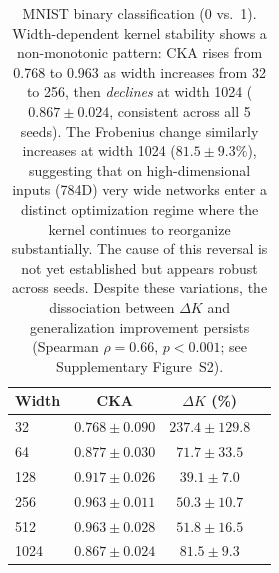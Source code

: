 \documentclass[twoside,11pt]{article}
\begin{document}
\begin{table}[ht]
    \centering
    \caption{MNIST binary classification (0 vs.\ 1).  Width-dependent kernel stability shows a non-monotonic pattern: CKA rises from 0.768 to 0.963 as width increases from 32 to 256, then \emph{declines} at width 1024 ($0.867\pm0.024$, consistent across all 5 seeds).  The Frobenius change similarly increases at width 1024 ($81.5\pm9.3\%$), suggesting that on high-dimensional inputs (784D) very wide networks enter a distinct optimization regime where the kernel continues to reorganize substantially.  The cause of this reversal is not yet established but appears robust across seeds.  Despite these variations, the dissociation between $\Delta K$ and generalization improvement persists (Spearman $\rho=0.66$, $p<0.001$; see Supplementary Figure~S2).}
    \label{tab:mnist}
    \begin{tabular}{lccc}
    \toprule
    Width & CKA & $\Delta K$ (\%) \\
    \midrule
    32   & $0.768\pm0.090$ & $237.4\pm129.8$ \\
    64   & $0.877\pm0.030$ & $71.7\pm33.5$   \\
    128  & $0.917\pm0.026$ & $39.1\pm7.0$    \\
    256  & $0.963\pm0.011$ & $50.3\pm10.7$   \\
    512  & $0.963\pm0.028$ & $51.8\pm16.5$   \\
    1024 & $0.867\pm0.024$ & $81.5\pm9.3$    \\
    \bottomrule
    \end{tabular}
\end{table}
\end{document}
